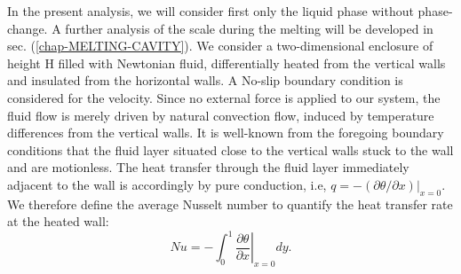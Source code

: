 In the present analysis, we will consider first only the liquid phase without phase-change.
A further analysis of the scale during the melting will be developed in sec. (\ref{chap-MELTING-CAVITY}).
We consider a two-dimensional enclosure of height H filled with Newtonian fluid, differentially heated from the vertical walls and insulated from the horizontal walls.
A No-slip boundary condition is considered for the velocity. 
Since no external force is applied to our system, the fluid flow is merely driven by natural convection flow, induced by temperature differences from the vertical walls.
It is well-known from the foregoing boundary conditions that the fluid layer situated close to the vertical walls stuck to the wall and are motionless.
The heat transfer through the fluid layer immediately adjacent to the wall is accordingly by pure conduction, i.e, $ q = - \left. (\partial \theta/ \partial x) \right |_{x=0} $.
We therefore define the average Nusselt number to quantify the heat transfer rate at the heated wall:
\begin{equation}\label{eq-def-Nu}
   N\!u = - \int_0^1 \left. \frac{\partial \theta}{\partial x} \right |_{x=0} dy.
\end{equation}

